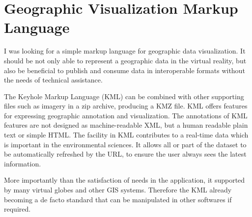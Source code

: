 \section{Geographic Visualization Markup Language}

I was looking for a simple markup language for geographic data visualization. It should be not only able to represent a geographic data in the virtual reality, but also be beneficial to publish and consume data in interoperable formats without the needs of technical assistance. 

The Keyhole Markup Language (KML) can be combined with other supporting files such as imagery in a zip archive, producing a KMZ file. KML offers features for expressing geographic annotation and visualization. The annotations of KML features are not designed as machine-readable XML, but a human readable plain text or simple HTML. The  facility in KML contributes to a real-time data which is important in the environmental sciences. It allows all or part of the dataset to be automatically refreshed by the URL, to ensure the user always sees the latest information.

More importantly than the satisfaction of needs in the application, it supported by many virtual globes and other GIS systems. Therefore the KML already becoming a de facto standard \cite{blower.sharing-visualizing.2007} that can be manipulated in other softwares if required. 

